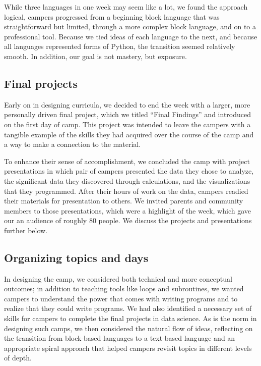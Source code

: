 While three languages in one week may seem like a lot, we found the
approach logical, campers progressed from a beginning block language 
that was straightforward but limited, through a more complex block
language, and on to a professional tool.  Because we tied ideas of
each language to the next, and because all languages represented
forms of Python, the transition seemed relatively smooth.  In
addition, our goal is not mastery, but exposure.

\subsection{Final projects}

Early on in designing curricula, we decided to end the week with a
larger, more personally driven final project, which we titled ``Final
Findings'' and introduced on the first day of camp.  This project
was intended to leave the campers with a tangible example of the
skills they had acquired over the course of the camp and a way to
make a connection to the material.

To enhance their sense of accomplishment, we concluded the camp
with project presentations in which pair of campers presented the
data they chose to analyze, the significant data they discovered
through calculations, and the visualizations that they programmed.
After their hours of work on the data, campers readied their materials
for presentation to others.  We invited parents and community members
to those presentations, which were a highlight of the week, which
gave our an audience of roughly 80 people.  We discuss the
projects and presentations further below.

\subsection{Organizing topics and days}

In designing the camp, we considered both technical and
more conceptual outcomes; in addition to teaching tools
like loops and subroutines, we wanted campers to understand the
power that comes with writing programs and to realize that they
could write programs.  We had also identified a necessary set
of skills for campers to complete the final projects in data
science.  As is the norm in designing such camps, we then considered
the natural flow of ideas, reflecting on the transition from
block-based languages to a text-based language and an appropriate
spiral approach that helped campers revisit topics in different
levels of depth.

